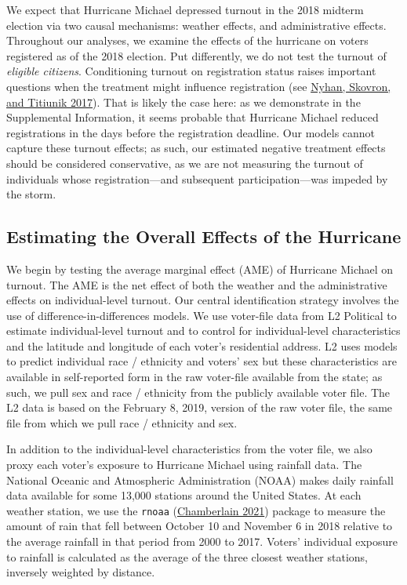 \documentclass[
  12pt,
]{article}
\begin{document}
We expect that Hurricane Michael depressed turnout in the 2018 midterm election via two causal mechanisms: weather effects, and administrative effects. Throughout our analyses, we examine the effects of the hurricane on voters registered as of the 2018 election. Put differently, we do not test the turnout of \emph{eligible citizens}. Conditioning turnout on registration status raises important questions when the treatment might influence registration (see \protect\hyperlink{ref-Nyhan2017}{Nyhan, Skovron, and Titiunik 2017}). That is likely the case here: as we demonstrate in the Supplemental Information, it seems probable that Hurricane Michael reduced registrations in the days before the registration deadline. Our models cannot capture these turnout effects; as such, our estimated negative treatment effects should be considered conservative, as we are not measuring the turnout of individuals whose registration---and subsequent participation---was impeded by the storm.

\hypertarget{estimating-the-overall-effects-of-the-hurricane}{%
\subsection*{Estimating the Overall Effects of the Hurricane}\label{estimating-the-overall-effects-of-the-hurricane}}

We begin by testing the average marginal effect (AME) of Hurricane Michael on turnout. The AME is the net effect of both the weather and the administrative effects on individual-level turnout. Our central identification strategy involves the use of difference-in-differences models. We use voter-file data from L2 Political to estimate individual-level turnout and to control for individual-level characteristics and the latitude and longitude of each voter's residential address. L2 uses models to predict individual race / ethnicity and voters' sex but these characteristics are available in self-reported form in the raw voter-file available from the state; as such, we pull sex and race / ethnicity from the publicly available voter file. The L2 data is based on the February 8, 2019, version of the raw voter file, the same file from which we pull race / ethnicity and sex.

In addition to the individual-level characteristics from the voter file, we also proxy each voter's exposure to Hurricane Michael using rainfall data. The National Oceanic and Atmospheric Administration (NOAA) makes daily rainfall data available for some 13,000 stations around the United States. At each weather station, we use the \texttt{rnoaa} (\protect\hyperlink{ref-Chamberlain2021}{Chamberlain 2021}) package to measure the amount of rain that fell between October 10 and November 6 in 2018 relative to the average rainfall in that period from 2000 to 2017. Voters' individual exposure to rainfall is calculated as the average of the three closest weather stations, inversely weighted by distance.
\end{document}
